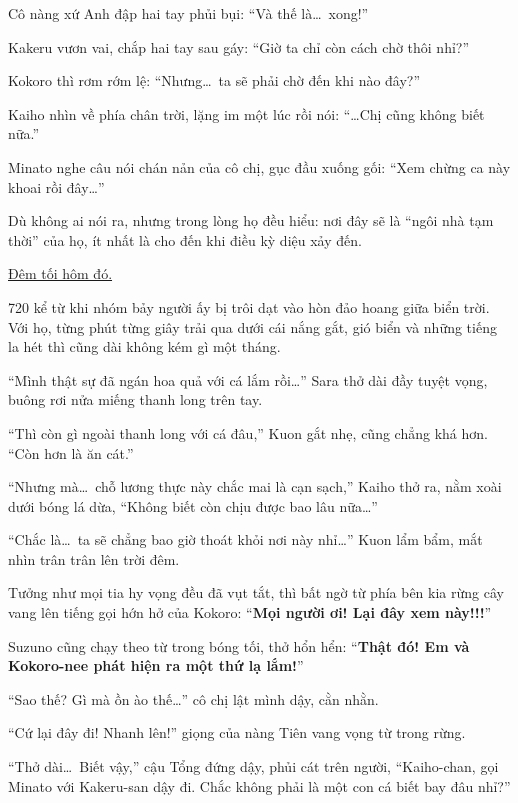 \documentclass[../main.tex]{subfiles}
\begin{document}

Cô nàng xứ Anh đập hai tay phủi bụi: ``Và thế là\dots\ xong!''

Kakeru vươn vai, chắp hai tay sau gáy: ``Giờ ta chỉ còn cách chờ thôi nhỉ?''

Kokoro thì rơm rớm lệ: ``Nhưng\dots\ ta sẽ phải chờ đến khi nào đây?''

Kaiho nhìn về phía chân trời, lặng im một lúc rồi nói: ``\dots Chị cũng không biết nữa.''

Minato nghe câu nói chán nản của cô chị, gục đầu xuống gối: ``Xem chừng ca này khoai rồi đây\dots''

Dù không ai nói ra, nhưng trong lòng họ đều hiểu: nơi đây sẽ là ``ngôi nhà tạm thời'' của họ, ít nhất là cho đến khi điều kỳ diệu xảy đến.

\uline{Đêm tối hôm đó.}

720  kể từ khi nhóm bảy người ấy bị trôi dạt vào hòn đảo hoang giữa biển trời. Với họ, từng phút từng giây trải qua dưới cái nắng gắt, gió biển và những tiếng la hét thì cũng dài không kém gì một tháng.

``Mình thật sự đã ngán hoa quả với cá lắm rồi\dots'' Sara thở dài đầy tuyệt vọng, buông rơi nửa miếng thanh long trên tay.

``Thì còn gì ngoài thanh long với cá đâu,'' Kuon gắt nhẹ, cũng chẳng khá hơn. ``Còn hơn là ăn cát.''

``Nhưng mà\dots\ chỗ lương thực này chắc mai là cạn sạch,'' Kaiho thở ra, nằm xoài dưới bóng lá dừa, ``Không biết còn chịu được bao lâu nữa\dots''

``Chắc là\dots\ ta sẽ chẳng bao giờ thoát khỏi nơi này nhỉ\dots'' Kuon lẩm bẩm, mắt nhìn trân trân lên trời đêm.

Tưởng như mọi tia hy vọng đều đã vụt tắt, thì bất ngờ từ phía bên kia rừng cây vang lên tiếng gọi hớn hở của Kokoro: ``\textbf{Mọi người ơi! Lại đây xem này!!!}''

Suzuno cũng chạy theo từ trong bóng tối, thở hổn hển: ``\textbf{Thật đó! Em và Kokoro-nee phát hiện ra một thứ lạ lắm!}''

``Sao thế? Gì mà ồn ào thế\dots'' cô chị lật mình dậy, cằn nhằn.

``Cứ lại đây đi! Nhanh lên!'' giọng của nàng Tiên vang vọng từ trong rừng.

``Thở dài\dots\ Biết vậy,'' cậu Tổng đứng dậy, phủi cát trên người, ``Kaiho-chan, gọi Minato với Kakeru-san dậy đi. Chắc không phải là một con cá biết bay đâu nhỉ?''
\end{document}
